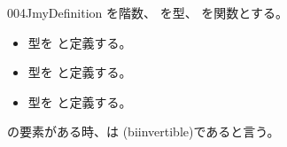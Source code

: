 \documentclass[index]{subfiles}
\begin{document}
\begin{myBlock}{004J}{myDefinition}
  を階数、
  を型、
  を関数とする。
  \begin{itemize}
  \item 型を
    と定義する。
  \item 型を
    と定義する。
  \item 型を
    と定義する。
  \end{itemize}
  の要素がある時、は
  (biinvertible)であると言う。
\end{myBlock}
\end{document}
